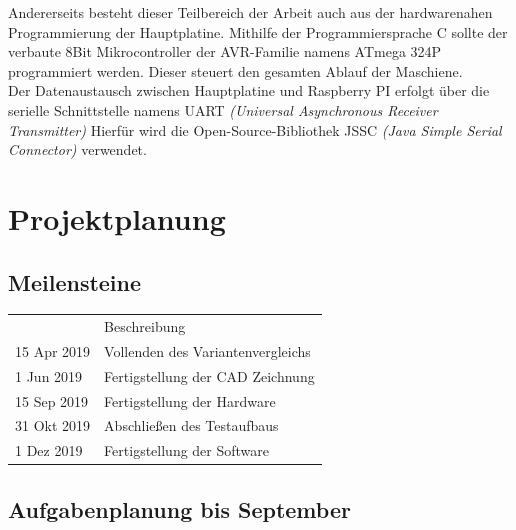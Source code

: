 Andererseits besteht dieser Teilbereich der Arbeit auch aus der hardwarenahen Programmierung der Hauptplatine. Mithilfe der Programmiersprache C sollte der verbaute 8Bit Mikrocontroller der AVR-Familie namens ATmega 324P programmiert werden.
Dieser steuert den gesamten Ablauf der Maschiene. \\

Der Datenaustausch zwischen Hauptplatine und Raspberry PI erfolgt über die serielle Schnittstelle namens UART
{\itshape (Universal Asynchronous Receiver Transmitter)}
Hierfür wird die Open-Source-Bibliothek JSSC
{\itshape (Java Simple Serial Connector)}  verwendet.
\chapter{Projektplanung}
\label{sec:Projektplanung}
\section{Meilensteine}
\begin{table}[h!]
    \begin{tabular}{ll}
        \hline
        \rowcolor[HTML]{C0C0C0}
        \multicolumn{2}{c}{\cellcolor[HTML]{C0C0C0}\textbf{Meilensteine}}                      \\ \hline
        \rowcolor[HTML]{EFEFEF}
        \multicolumn{1}{l|}{\cellcolor[HTML]{EFEFEF}Datum} & Beschreibung                      \\ \hline
        \multicolumn{1}{l|}{15 Apr 2019}                   & Vollenden des Variantenvergleichs \\ \hline
        \multicolumn{1}{l|}{1 Jun 2019}                    & Fertigstellung der CAD Zeichnung  \\ \hline
        \multicolumn{1}{l|}{15 Sep 2019}                   & Fertigstellung der Hardware       \\ \hline
        \multicolumn{1}{l|}{31 Okt 2019}                   & Abschließen des Testaufbaus       \\ \hline
        \multicolumn{1}{l|}{1 Dez 2019}                    & Fertigstellung der Software       \\ \hline
    \end{tabular}
\end{table}

\section{Aufgabenplanung bis September}

